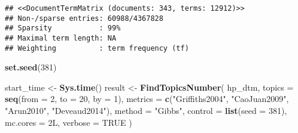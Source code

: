 \documentclass[
]{article}
\newenvironment{Shaded}{\begin{snugshade}}{\end{snugshade}}
\newcommand{\CommentTok}[1]{\textcolor[rgb]{0.56,0.35,0.01}{\textit{#1}}}
\newcommand{\DataTypeTok}[1]{\textcolor[rgb]{0.13,0.29,0.53}{#1}}
\newcommand{\DecValTok}[1]{\textcolor[rgb]{0.00,0.00,0.81}{#1}}
\newcommand{\KeywordTok}[1]{\textcolor[rgb]{0.13,0.29,0.53}{\textbf{#1}}}
\newcommand{\NormalTok}[1]{#1}
\newcommand{\OperatorTok}[1]{\textcolor[rgb]{0.81,0.36,0.00}{\textbf{#1}}}
\newcommand{\OtherTok}[1]{\textcolor[rgb]{0.56,0.35,0.01}{#1}}
\newcommand{\StringTok}[1]{\textcolor[rgb]{0.31,0.60,0.02}{#1}}
\begin{document}
\begin{Shaded}
\end{Shaded}

\begin{verbatim}
## <<DocumentTermMatrix (documents: 343, terms: 12912)>>
## Non-/sparse entries: 60988/4367828
## Sparsity           : 99%
## Maximal term length: NA
## Weighting          : term frequency (tf)
\end{verbatim}

\begin{Shaded}
\begin{Highlighting}[]
\KeywordTok{set.seed}\NormalTok{(}\DecValTok{381}\NormalTok{)}
\end{Highlighting}
\end{Shaded}

\begin{Shaded}
\begin{Highlighting}[]
\NormalTok{start_time <-}\StringTok{ }\KeywordTok{Sys.time}\NormalTok{()}
\NormalTok{result <-}\StringTok{ }\KeywordTok{FindTopicsNumber}\NormalTok{(}
\NormalTok{  hp_dtm,}
  \DataTypeTok{topics =} \KeywordTok{seq}\NormalTok{(}\DataTypeTok{from =} \DecValTok{2}\NormalTok{, }\DataTypeTok{to =} \DecValTok{20}\NormalTok{, }\DataTypeTok{by =} \DecValTok{1}\NormalTok{),}
  \DataTypeTok{metrics =} \KeywordTok{c}\NormalTok{(}\StringTok{"Griffiths2004"}\NormalTok{, }\StringTok{"CaoJuan2009"}\NormalTok{, }\StringTok{"Arun2010"}\NormalTok{, }\StringTok{"Deveaud2014"}\NormalTok{),}
  \DataTypeTok{method =} \StringTok{"Gibbs"}\NormalTok{,}
  \DataTypeTok{control =} \KeywordTok{list}\NormalTok{(}\DataTypeTok{seed =} \DecValTok{381}\NormalTok{),}
  \DataTypeTok{mc.cores =}\NormalTok{ 2L,}
  \DataTypeTok{verbose =} \OtherTok{TRUE}
\NormalTok{)}
\end{Highlighting}
\end{Shaded}
\end{document}

